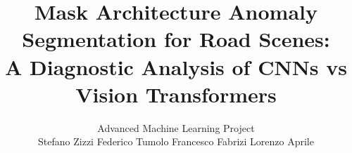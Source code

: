\documentclass[10pt,twocolumn,letterpaper]{article}
\title{Mask Architecture Anomaly Segmentation for Road Scenes: \\A Diagnostic Analysis of CNNs vs Vision Transformers}
\author{Advanced Machine Learning Project\\[0.75em]
Stefano Zizzi \quad Federico Tumolo \quad Francesco Fabrizi \quad Lorenzo Aprile}
\begin{document}
\maketitle
    






%
%
{
    \small
    
    
}

% 
\end{document}
